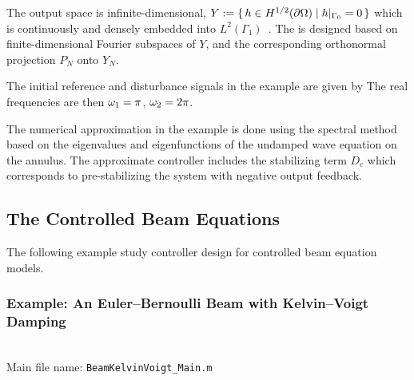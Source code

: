 \documentclass[11pt, a4paper]{amsart}
\theoremstyle{definition}
\numberwithin{equation}{section}
\begin{document}
{  The output space is infinite-dimensional,  $Y :=  \{\,h\in H^{1/2}(\partial\Omega)\mid h\vert_{\Gamma_0}=0\,\}$ which is continuously and densely embedded into $L^2(\Gamma_1)$~. 
  The  is designed based on finite-dimensional Fourier subspaces
  of $Y$, and the corresponding orthonormal projection $P_N$ onto $Y_N$.

  The initial reference and disturbance signals in the example are given by
  The real frequencies are then $\omega_1=\pi$, $ \omega_2=2\pi$.

  The numerical approximation in the example is done using the spectral method based on the eigenvalues and eigenfunctions of the undamped wave equation on the annulus. The approximate controller includes the stabilizing term $D_c$ which corresponds to pre-stabilizing the system with negative output feedback. 
}

\subsection{The Controlled Beam Equations}
\label{sec:ControlledBeams}


The following example study controller design for controlled beam equation models.


\medskip

\subsubsection*{Example: An Euler--Bernoulli Beam with Kelvin--Voigt Damping}
~\\[-1ex]

\noindent Main file name: \texttt{BeamKelvinVoigt\_Main.m}
\end{document}
